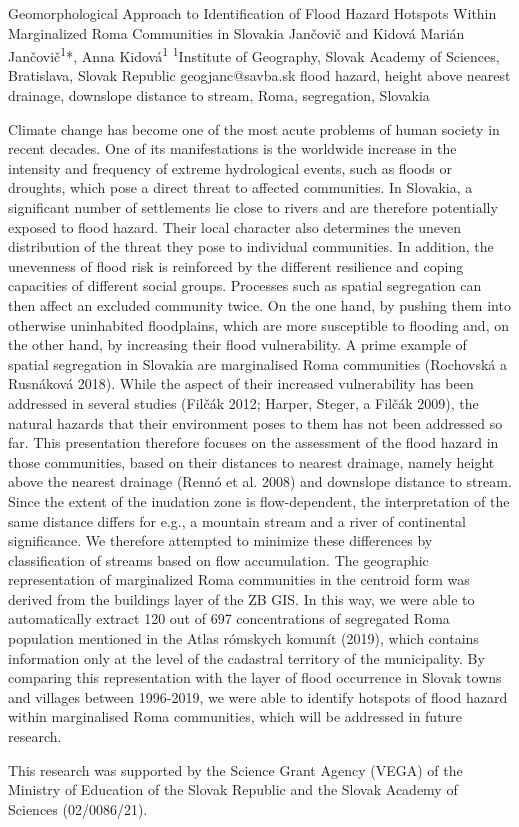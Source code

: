 \abstract
{Geomorphological Approach to Identification of Flood Hazard Hotspots Within Marginalized Roma Communities in Slovakia} %
{Jančovič and Kidová} %
{Marián Jančovič\textsuperscript{1}*, Anna Kidová\textsuperscript{1}} %
{\KLtag} %
{\textsuperscript{1}Institute of Geography, Slovak Academy of Sciences, Bratislava, Slovak Republic
} %
{geogjanc@savba.sk}  %
{flood hazard, height above nearest drainage, downslope distance to stream, Roma, segregation, Slovakia}%
{Climate change has become one of the most acute problems of human society in recent decades. One of its manifestations is the worldwide increase in the intensity and frequency of extreme hydrological events, such as floods or droughts, which pose a direct threat to affected communities. In Slovakia, a significant number of settlements lie close to rivers and are therefore potentially exposed to flood hazard. Their local character also determines the uneven distribution of the threat they pose to individual communities. In addition, the unevenness of flood risk is reinforced by the different resilience and coping capacities of different social groups. Processes such as spatial segregation can then affect an excluded community twice. On the one hand, by pushing them into otherwise uninhabited floodplains, which are more susceptible to flooding and, on the other hand, by increasing their flood vulnerability. A prime example of spatial segregation in Slovakia are marginalised Roma communities (Rochovská a Rusnáková 2018). While the aspect of their increased vulnerability has been addressed in several studies (Filčák 2012; Harper, Steger, a Filčák 2009), the natural hazards that their environment poses to them has not been addressed so far. This presentation therefore focuses on the assessment of the flood hazard in those communities, based on their distances to nearest drainage, namely height above the nearest drainage (Rennó et al. 2008) and downslope distance to stream. Since the extent of the inudation zone is flow-dependent, the interpretation of the same distance differs for e.g., a mountain stream and a river of continental significance. We therefore attempted to minimize these differences by classification of streams based on flow accumulation. The geographic representation of marginalized Roma communities in the centroid form was derived from the buildings layer of the ZB GIS. In this way, we were able to automatically extract 120 out of 697 concentrations of segregated Roma population mentioned in the Atlas rómskych komunít (2019), which contains information only at the level of the cadastral territory of the municipality. By comparing this representation with the layer of flood occurrence in Slovak towns and villages between 1996-2019, we were able to identify hotspots of flood hazard within marginalised Roma communities, which will be addressed in future research.
	
	This research was supported by the Science Grant Agency (VEGA) of the Ministry of Education of the Slovak Republic and the Slovak Academy of Sciences (02/0086/21).
}%
